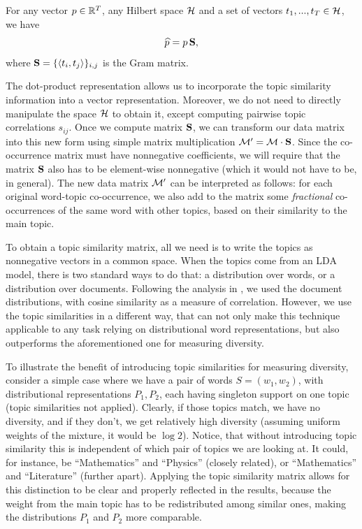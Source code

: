 \ber
For any vector $p\in{\mathbb R}^T$, any Hilbert space ${\mathcal H}$ and a set of
vectors $t_1,...,t_T\in{\mathcal H}$, we have 
\[\widehat{p} = p\operatorname{\mathbf{S}},\]
where $\operatorname{\mathbf{S}}=\{\langle t_i,t_j\rangle\}_{i,j}$ is the Gram matrix.
\eer

The dot-product representation allows us to incorporate the topic
similarity information into a vector representation. Moreover, we do
not need to directly manipulate the space ${\mathcal H}$ to obtain it, except
computing pairwise topic correlations $s_{ij}$. Once we compute matrix
$\operatorname{\mathbf{S}}$, we can transform our data matrix into this new form using simple
matrix multiplication ${\mathcal M}'={\mathcal M}\cdot \operatorname{\mathbf{S}}$. Since the co-occurrence matrix
must have nonnegative coefficients, we will require that the matrix
$\operatorname{\mathbf{S}}$ also has to be element-wise nonnegative (which it would not
have to be, in general). The new data matrix ${\mathcal M}'$ can be interpreted
as follows: for each original word-topic co-occurrence, we also add to
the matrix some {\em fractional} co-occurrences of the same word with
other topics, based on their similarity to the main topic.

To obtain a topic similarity matrix, all we need is to write
the topics as nonnegative vectors in a common space. When the topics
come from an LDA model, there is two standard ways to do that: a
distribution over words, or a distribution over documents. Following
the analysis in \cite{bache:2013}, we used the document distributions,
with cosine similarity as a measure of correlation. However, we use the
topic similarities in a different way, that can not only make this
technique applicable to any task relying on distributional word
representations, but also outperforms the aforementioned one for
measuring diversity.

To illustrate the benefit of introducing topic similarities for
measuring diversity, consider a simple case where we have a pair of words
$S=(w_1,w_2)$, with distributional representations $P_1,P_2$, each having
singleton support on one topic (topic similarities not
applied). Clearly, if those topics match, we 
have no diversity, and if they don't, we get relatively high diversity
(assuming uniform weights of the mixture, it would be $\log 2$). Notice, that without introducing topic similarity this is
independent of which pair of topics we are looking at. It could, for
instance, be ``Mathematics'' and ``Physics'' (closely related), or
``Mathematics'' and ``Literature'' (further apart).  Applying the
topic similarity matrix allows for this distinction to be clear and properly
reflected in the results, because the weight from the main topic has
to be redistributed among similar ones, making the distributions $P_1$
and $P_2$ more comparable.

